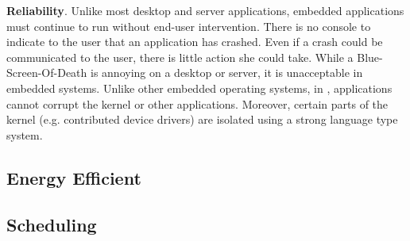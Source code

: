 {\bf Reliability}. Unlike most desktop and server applications, embedded
applications must continue to run without end-user intervention. There is no
console to indicate to the user that an application has crashed. Even if a crash
could be communicated to the user, there is little action she could take. While
a Blue-Screen-Of-Death is annoying on a desktop or server, it is unacceptable in
embedded systems. Unlike other embedded operating systems, in \name,
applications cannot corrupt the kernel or other applications. Moreover, certain
parts of the kernel (e.g. contributed device drivers) are isolated using
a strong language type system.

\subsection{Energy Efficient}


\subsection{Scheduling}



